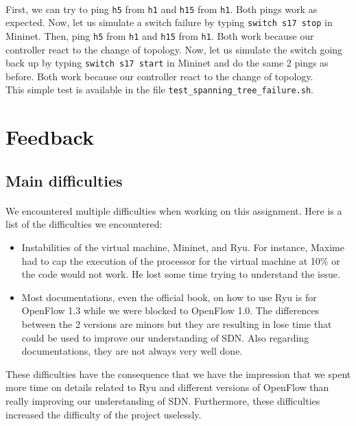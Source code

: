 \documentclass[a4paper, 11pt, oneside]{article}
\begin{document}
\paragraph{}First, we can try to ping \texttt{h5} from \texttt{h1} and \texttt{h15} from \texttt{h1}. Both pings work as expected. Now, let us simulate a switch failure by typing \texttt{switch s17 stop} in Mininet. Then, ping \texttt{h5} from \texttt{h1} and \texttt{h15} from \texttt{h1}. Both work because our controller react to the change of topology. Now, let us simulate the switch going back up by typing \texttt{switch s17 start} in Mininet and do the same 2 pings as before. Both work because our controller react to the change of topology.\\
This simple test is available in the file \texttt{test\_spanning\_tree\_failure.sh}.


\section{Feedback} \label{sec:feedback}
\subsection{Main difficulties}
\paragraph{}We encountered multiple difficulties when working on this assignment. Here is a list of the difficulties we encountered:
\begin{itemize}
\item Instabilities of the virtual machine, Mininet, and Ryu. For instance, Maxime had to cap the execution of the processor for the virtual machine at 10\% or the code would not work. He lost some time trying to understand the issue.
\item Most documentations, even the official book, on how to use Ryu is for OpenFlow 1.3 while we were blocked to OpenFlow 1.0. The differences between the 2 versions are minors but they are resulting in lose time that could be used to improve our understanding of SDN. Also regarding documentations, they are not always very well done.
\end{itemize}
These difficulties have the consequence that we have the impression that we spent more time on details related to Ryu and different versions of OpenFlow than really improving our understanding of SDN. Furthermore, these difficulties increased the difficulty of the project uselessly.
\end{document}
